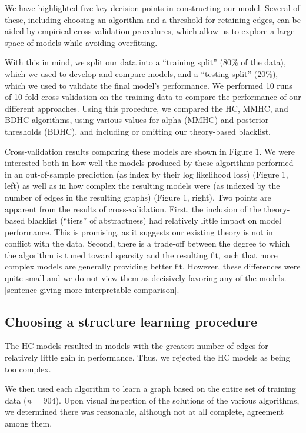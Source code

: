 \documentclass[10pt, letterpaper]{article}
\begin{document}
We have highlighted five key decision points in constructing our model.
Several of these, including choosing an algorithm and a threshold for
retaining edges, can be aided by empirical cross-validation procedures,
which allow us to explore a large space of models while avoiding
overfitting.

With this in mind, we split our data into a ``training split'' (80\% of
the data), which we used to develop and compare models, and a ``testing
split'' (20\%), which we used to validate the final model's performance.
We performed 10 runs of 10-fold cross-validation on the training data to
compare the performance of our different approaches. Using this
procedure, we compared the HC, MMHC, and BDHC algorithms, using various
values for alpha (MMHC) and posterior thresholds (BDHC), and including
or omitting our theory-based blacklist.

Cross-validation results comparing these models are shown in Figure 1.
We were interested both in how well the models produced by these
algorithms performed in an out-of-sample prediction (as index by their
log likelihood loss) (Figure 1, left) as well as in how complex the
resulting models were (as indexed by the number of edges in the
resulting graphs) (Figure 1, right). Two points are apparent from the
results of cross-validation. First, the inclusion of the theory-based
blacklist (``tiers'' of abstractness) had relatively little impact on
model performance. This is promising, as it suggests our existing theory
is not in conflict with the data. Second, there is a trade-off between
the degree to which the algorithm is tuned toward sparsity and the
resulting fit, such that more complex models are generally providing
better fit. However, these differences were quite small and we do not
view them as decisively favoring any of the models. {[}sentence giving
more interpretable comparison{]}.

\subsection{Choosing a structure learning
procedure}\label{choosing-a-structure-learning-procedure}

The HC models resulted in models with the greatest number of edges for
relatively little gain in performance. Thus, we rejected the HC models
as being too complex.

We then used each algorithm to learn a graph based on the entire set of
training data (\emph{n} = 904). Upon visual inspection of the solutions
of the various algorithms, we determined there was reasonable, although
not at all complete, agreement among them.
\end{document}
